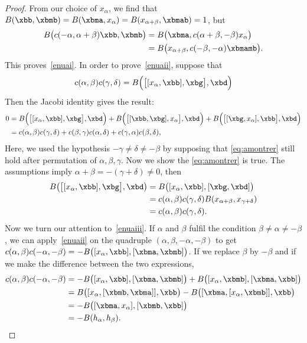 \begin{proof}
From our choice of $ x_{\alpha}$, we find that $B(\xbb,\xbmb)=B(\xbma, x_{\alpha})=B(x_{\alpha+\beta},\xbmab)=1$, but
\begin{equation}
\begin{split}
  B\big(c(-\alpha,\alpha+\beta)\xbb,\xbmb\big)&=B\big(\xbma,c(\alpha+\beta,-\beta) x_{\alpha}\big)\\
                        &=B\big(x_{\alpha+\beta},c(-\beta,-\alpha)\xbmamb \big).
\end{split}
\end{equation}
This proves~\ref{enuai}. In order to prove~\ref{enuaii}, suppose that
\begin{equation}\label{eq:amontrer}
c(\alpha,\beta)c(\gamma,\delta)=B\Big(  \big[[ x_{\alpha},\xbb],\xbg\big] ,\xbd  \Big)
\end{equation}
Then the Jacobi identity gives the result:
\begin{equation}
\begin{split}
0&=B\Big( \big[[ x_{\alpha},\xbb],\xbg\big],\xbd \Big)+B\Big(\big[[\xbb,\xbg], x_{\alpha}\big],\xbd\Big)+B\Big(\big[[\xbg, x_{\alpha}],\xbb\big] ,\xbd\Big)\\
&=c(\alpha,\beta)c(\gamma,\delta)+c(\beta,\gamma)c(\alpha,\delta)+c(\gamma,\alpha)c(\beta,\delta),
\end{split}
\end{equation}
Here, we used the hypothesis $-\gamma\neq\delta\neq -\beta$ by supposing that \eqref{eq:amontrer} still hold after permutation of $\alpha,\beta,\gamma$.
Now we show the \eqref{eq:amontrer} is true. The assumptions imply  $\alpha+\beta=-(\gamma+\delta)\neq 0$, then
\begin{equation}
\begin{split}
B\big(\big[[ x_{\alpha},\xbb],\xbg \big],\xbd\big)&=B\big( [ x_{\alpha},\xbb],[\xbg,\xbd]  \big)\\
&=c(\alpha,\beta)c(\gamma,\delta)B(x_{\alpha+\beta},x_{\gamma+\delta})\\
&=c(\alpha,\beta)c(\gamma,\delta).
\end{split}
\end{equation}
Now we turn our attention to~\ref{enuaiii}. If $\alpha$ and $\beta$ fulfil the condition $\beta\neq\alpha\neq-\beta$, we can apply~\ref{enuaii} on the quadruple $(\alpha,\beta,-\alpha,-\beta)$ to get $c(\alpha,\beta)c(-\alpha,-\beta)=
-B\big(   [ x_{\alpha},\xbb],[\xbma,\xbmb]   \big)$.
If we replace $\beta$ by $-\beta$ and if we make the difference between the two expressions,
\begin{equation}
\begin{split}
c(\alpha,\beta)c(-\alpha,-\beta)&=-B\big(   [ x_{\alpha},\xbb],[\xbma,\xbmb]    \big)+B\big(   [ x_{\alpha},\xbmb],[\xbma,\xbb]    \big)\\
&=B\big( [ x_{\alpha},[\xbmb,\xbma]],\xbb \big)-B\big(
[\xbma,[ x_{\alpha},\xbmb]],\xbb \big)\\
&=-B\big( [\xbma, x_{\alpha}],[\xbmb,\xbb]  \big) \\
&=-B(h_{\alpha},h_{\beta}).
\end{split}
\end{equation}


\end{proof}
